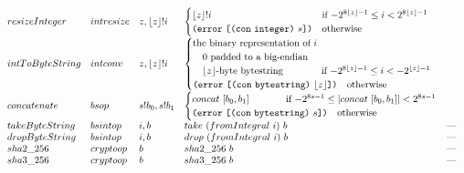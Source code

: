 \documentclass[../main.tex]{subfiles}
\begin{document}
\begin{figure*}[t]
\[\begin{array}{lllll}
        resizeInteger   &  intresize  &   z, \sizeTermToSize{z}!i   & \begin{cases}
            \sizeTermToSize{z}!i & \text{if $-2^{8\sizeTermToSize{z}-1} \leq i < 2^{8\sizeTermToSize{z}-1}$}\\
            \error{\appT{\conT{\conIntegerType{}}}{s}} & \text{otherwise}\\
        \end{cases}\\
        
        intToByteString  &   intconv  &  z, \sizeTermToSize{z}!i           & \begin{cases}
            \text{the binary representation of $i$} \\
            \quad\text{$0$ padded to a big-endian}\\
            \quad\text{$\sizeTermToSize{z}$-byte bytestring}&\!\!\!\!\!\!\!\!\!\!\!\!\!\!\!\!\text{if $-2^{8\sizeTermToSize{z}-1} \leq i < -2^{\sizeTermToSize{z}-1}$}\\
            \error{\appT{\conT{\conBytestringType{}}}{\sizeTermToSize{z}}} & \text{otherwise}\\
        \end{cases}\\
        
        
        concatenate   &   bsop   &   s!b_0 , s!b_1   & \begin{cases}
            concat ~ [b_0,b_1] & \!\!\!\!\!\!\!\!\!\!\!\!\!\!\!\!\!\!\!\!\!\!\!\!\!\!\!\!\!\!\!\!\text{if $-2^{8s-1} \leq |concat ~ [b_0,b_1]| < 2^{8s-1}$}\\
            \error{\appT{\conT{\conBytestringType{}}}{s}} & \text{otherwise}\\
        \end{cases}\\
        
        takeByteString    &   bsintop   &   i, b     & take ~ (fromIntegral ~ i) ~ b   &   \textrm{---} \\
        dropByteString    &   bsintop   &   i, b     & drop ~ (fromIntegral ~ i) ~ b   &   \textrm{---} \\
        
        sha2\_256         &  cryptoop  &   b           & sha2\_256 ~ b    & \textrm{---}                \\
        sha3\_256         &  cryptoop  &   b           & sha3\_256~ b     & \textrm{---}                \\
        

\end{array}\]
\end{figure*}
\end{document}
